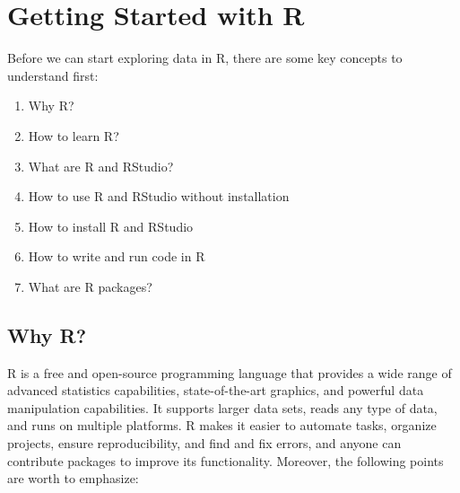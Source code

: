 \documentclass[
  12pt,
  oneside]{book}
\providecommand{\tightlist}{%
  \setlength{\itemsep}{0pt}\setlength{\parskip}{0pt}}
\theoremstyle{definition}
\theoremstyle{definition}
\theoremstyle{definition}
\theoremstyle{definition}
\theoremstyle{remark}
\begin{document}
\hypertarget{getting-started}{%
\chapter{Getting Started with R}\label{getting-started}}

Before we can start exploring data in R, there are some key concepts to understand first:

\begin{enumerate}
\def\labelenumi{\arabic{enumi}.}
\tightlist
\item
  Why R?
\item
  How to learn R?
\item
  What are R and RStudio?
\item
  How to use R and RStudio without installation
\item
  How to install R and RStudio
\item
  How to write and run code in R
\item
  What are R packages?
\end{enumerate}

\hypertarget{sec:whyR}{%
\section{Why R?}\label{sec:whyR}}

R is a free and open-source programming language that provides a wide range of advanced statistics capabilities, state-of-the-art graphics, and powerful data manipulation capabilities. It supports larger data sets, reads any type of data, and runs on multiple platforms. R makes it easier to automate tasks, organize projects, ensure reproducibility, and find and fix errors, and anyone can contribute packages to improve its functionality. Moreover, the following points are worth to emphasize:
\end{document}
